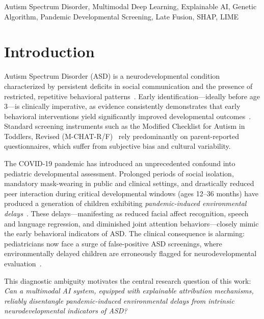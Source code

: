\documentclass[conference]{IEEEtran}
\begin{document}
\begin{IEEEkeywords}
Autism Spectrum Disorder, Multimodal Deep Learning, Explainable AI, Genetic Algorithm, Pandemic Developmental Screening, Late Fusion, SHAP, LIME
\end{IEEEkeywords}

\section{Introduction}
\label{sec:introduction}

Autism Spectrum Disorder (ASD) is a neurodevelopmental condition characterized by persistent deficits in social communication and the presence of restricted, repetitive behavioral patterns~\cite{american2013diagnostic}. Early identification---ideally before age 3---is clinically imperative, as evidence consistently demonstrates that early behavioral interventions yield significantly improved developmental outcomes~\cite{dawson2010randomized, rogers2012early}. Standard screening instruments such as the Modified Checklist for Autism in Toddlers, Revised (M-CHAT-R/F)~\cite{robins2014mchat} rely predominantly on parent-reported questionnaires, which suffer from subjective bias and cultural variability.

The COVID-19 pandemic has introduced an unprecedented confound into pediatric developmental assessment. Prolonged periods of social isolation, mandatory mask-wearing in public and clinical settings, and drastically reduced peer interaction during critical developmental windows (ages 12--36 months) have produced a generation of children exhibiting \textit{pandemic-induced environmental delays}~\cite{shuffrey2022association, deoni2021impact}. These delays---manifesting as reduced facial affect recognition, speech and language regression, and diminished joint attention behaviors---closely mimic the early behavioral indicators of ASD. The clinical consequence is alarming: pediatricians now face a surge of false-positive ASD screenings, where environmentally delayed children are erroneously flagged for neurodevelopmental evaluation~\cite{shan2021covid}.

This diagnostic ambiguity motivates the central research question of this work: \textit{Can a multimodal AI system, equipped with explainable attribution mechanisms, reliably disentangle pandemic-induced environmental delays from intrinsic neurodevelopmental indicators of ASD?}
\end{document}
